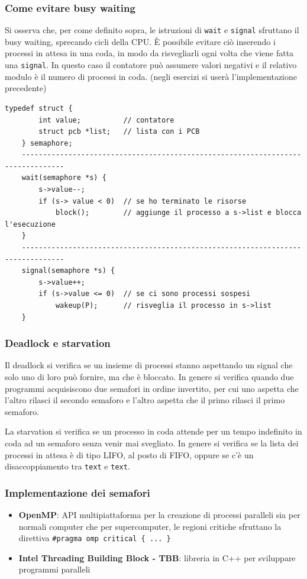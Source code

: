 \documentclass[a4paper]{article}
\begin{document}
\subsubsection*{Come evitare busy waiting}
Si osserva che, per come definito sopra, le istruzioni di \verb|wait| e \verb|signal| sfruttano il busy waiting, sprecando
cicli della CPU. È possibile evitare ciò inserendo i processi in attesa in una coda, in modo da risvegliarli ogni volta che
viene fatta una \verb|signal|. In questo caso il contatore può assumere valori negativi e il relativo modulo è il numero di
processi in coda. (negli esercizi si userà l'implementazione precedente)

\begin{lstlisting}[numbers=none]
	typedef struct {
		int value;          // contatore
		struct pcb *list;   // lista con i PCB
	} semaphore;
	--------------------------------------------------------------------------------
	wait(semaphore *s) {
		s->value--;
		if (s-> value < 0)  // se ho terminato le risorse
			block();        // aggiunge il processo a s->list e blocca l'esecuzione
	}
	--------------------------------------------------------------------------------
	signal(semaphore *s) {
		s->value++;
		if (s->value <= 0)  // se ci sono processi sospesi
			wakeup(P);      // risveglia il processo in s->list
	}
\end{lstlisting}

\subsubsection*{Deadlock e starvation}
Il deadlock si verifica se un insieme di processi stanno aspettando un signal che solo uno di loro può fornire, ma che è bloccato.
In genere si verifica quando due programmi acquisiscono due semafori in ordine invertito, per cui uno aspetta che l'altro rilasci
il secondo semaforo e l'altro aspetta che il primo rilasci il primo semaforo.

La starvation si verifica se un processo in coda attende per un tempo indefinito in coda ad un semaforo senza venir mai svegliato.
In genere si verifica se la lista dei processi in attesa è di tipo LIFO, al posto di FIFO, oppure se c'è un disaccoppiamento tra
\verb|text| e \verb|text|.

\subsubsection*{Implementazione dei semafori}
\begin{itemize}
	\item \textbf{OpenMP}: API multipiattaforma per la creazione di processi paralleli sia per normali computer che per
	supercomputer, le regioni critiche sfruttano la direttiva \verb|#pragma omp critical { ... }|
	\item \textbf{Intel Threading Building Block - TBB}: libreria in C++ per sviluppare programmi paralleli
\end{itemize}
\end{document}
